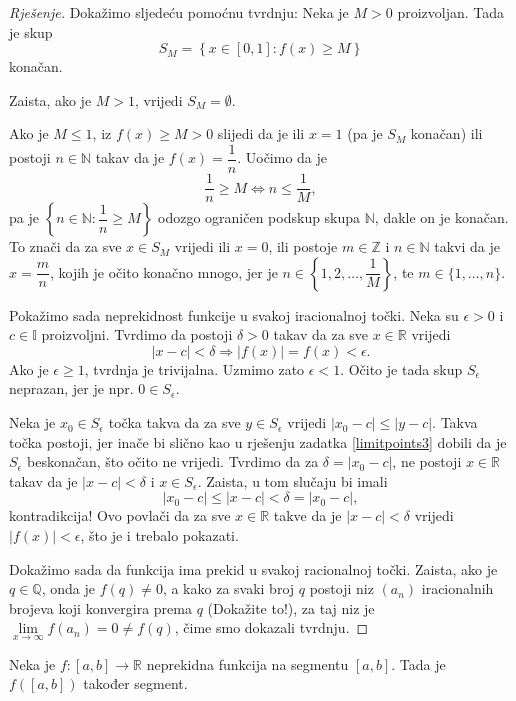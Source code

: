 \begin{proof}[Rješenje]
Dokažimo sljedeću pomoćnu tvrdnju: Neka je $M>0$ proizvoljan. Tada je skup
$$S_M=\left\{x\in[0, 1] : f(x)\geq M\right\}$$
konačan. 

Zaista, ako je $M>1$, vrijedi $S_M=\emptyset$. 

Ako je $M\leq 1$, iz $f(x)\geq M>0$ slijedi da je ili $x=1$ (pa je $S_M$ konačan) ili postoji $n\in \mathbb{N}$ takav da je $f(x)=\dfrac{1}{n}$. Uočimo da je $$\dfrac{1}{n}\geq M\Longleftrightarrow n\leq \dfrac{1}{M},$$ pa je $\left\{n\in \mathbb{N} : \dfrac{1}{n}\geq M\right\}$ odozgo ograničen podskup skupa $\mathbb{N}$, dakle on je konačan. To znači da za sve $x\in S_M$ vrijedi ili $x=0$, ili postoje $m\in \mathbb{Z}$ i $n\in \mathbb{N}$ takvi da je $x=\dfrac{m}{n}$, kojih je očito konačno mnogo, jer je $n\in \left\{1, 2,\dots, \dfrac{1}{M}\right\}$, te $m\in \{1, \dots, n\}$.

Pokažimo sada neprekidnost funkcije u svakoj iracionalnoj točki. Neka su $\epsilon>0$ i $c\in \mathbb{I}$ proizvoljni. Tvrdimo da postoji $\delta>0$ takav da za sve $x\in \mathbb{R}$ vrijedi $$|x-c|<\delta\Rightarrow |f(x)|=f(x)<\epsilon.$$ 
Ako je $\epsilon\geq 1$, tvrdnja je trivijalna. Uzmimo zato $\epsilon<1$. Očito je tada skup $S_\epsilon$ neprazan, jer je npr. $0\in S_\epsilon$.

Neka je $x_0\in S_\epsilon$ točka takva da za sve $y\in S_\epsilon$ vrijedi $|x_0-c|\leq|y-c|$. Takva točka postoji, jer inače bi slično kao u rješenju zadatka \ref{limitpoints3} dobili da je $S_\epsilon$ beskonačan, što očito ne vrijedi. Tvrdimo da za $\delta=|x_0-c|$, ne postoji $x\in \mathbb{R}$ takav da je $|x-c|<\delta$ i $x\in S_\epsilon$. Zaista, u tom slučaju bi imali $$|x_0-c|\leq |x-c|<\delta=|x_0-c|,$$ kontradikcija! Ovo povlači da za sve $x\in \mathbb{R}$ takve da je $|x-c|<\delta$ vrijedi $|f(x)|<\epsilon$, što je i trebalo pokazati.

Dokažimo sada da funkcija ima prekid u svakoj racionalnoj točki. Zaista, ako je $q\in \mathbb{Q}$, onda je $f(q)\neq 0$, a kako za svaki broj $q$ postoji niz $(a_n)$ iracionalnih brojeva koji konvergira prema $q$ (Dokažite to!), za taj niz je $\lim\limits_{x\to \infty}{f(a_n)}=0\neq f(q)$, čime smo dokazali tvrdnju.
\end{proof}
\begin{remark}
Neka je $f : [a, b]\to \mathbb{R}$ neprekidna funkcija na segmentu $[a, b]$. Tada je $f([a, b])$ također segment.
\end{remark}

